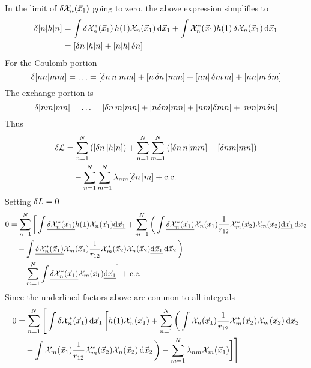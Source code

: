 \documentclass[12pt,a4paper,titlepage]{article}
\newcommand{\Chi}{\mathcal{X}} %
\begin{document}
In the limit of $\var{\Chi_{n}(\vec{x}_{1})}$ going to zero, the above expression simplifies to
\begin{equation}
\begin{aligned}
\var{[n|h|n]}&=\int\var{\Chi_{n}^{*}(\vec{x}_{1})}h(1)\Chi_{n}(\vec{x}_{1})\dd{\vec{x}_{1}}+\int\Chi_{n}^{*}(\vec{x}_{1})h(1)\var{\Chi_{n}(\vec{x}_{1})}\dd{\vec{x}_{1}}\\
&=[\var{n}|h|n]+[n|h|\var{n}]
\end{aligned}
\end{equation}
For the Coulomb portion
\begin{equation}
\var{[nn|mm]}=\ldots=[\var{n}n|mm]+[n\var{n}|mm]+[nn|\var{m}m]+[nn|m\var{m}]
\end{equation}
The exchange portion is
\begin{equation}
\var{[nm|mn]}=\ldots=[\var{n}m|mn]+[n\delta{m}|mn]+[nm|\delta{m}n]+[nm|m\delta{n}]
\end{equation}
Thus
\begin{equation}
\begin{aligned}
\var{\mathcal{L}}&=\sum_{n=1}^{N}\qty([\var{n}|h|n])+\sum_{n=1}^{N}\sum_{m=1}^{N}\qty([\var{n}n|mm]-[\delta{n}m|mn])\\
&\quad-\sum_{n=1}^{N}\sum_{m=1}^{N}\lambda_{nm}[\var{n}|m]+\qcc*
\end{aligned}
\end{equation}
Setting $\var{L}=0$
\begin{equation}
\begin{aligned}
0&=\sum_{n=1}^{N}\bigg[\int\underline{\var{\Chi_{n}^{*}(\vec{x}_{1})}}h(1)\Chi_{n}(\vec{x}_{1})\underline{\dd{\vec{x}_{1}}}+\sum_{m=1}^{N}\bigg(\int\underline{\var{\Chi_{n}^{*}(\vec{x}_{1})}}\Chi_{n}(\vec{x}_{1})\frac{1}{r_{12}}\Chi_{m}^{*}(\vec{x}_{2})\Chi_{m}(\vec{x}_{2})\underline{\dd{\vec{x}_{1}}}\dd{\vec{x}_{2}}\\
&\quad-\int\underline{\var{\Chi_{n}^{*}(\vec{x}_{1})}}\Chi_{m}(\vec{x}_{1})\frac{1}{r_{12}}\Chi_{m}^{*}(\vec{x}_{2})\Chi_{n}(\vec{x}_{2})\underline{\dd{\vec{x}_{1}}}\dd{\vec{x}_{2}}\bigg)\\
&\quad-\sum_{m=1}^{N}\int\underline{\var{\Chi_{n}^{*}(\vec{x}_{1})}}\Chi_{m}(\vec{x}_{1})\underline{\dd{\vec{x}_{1}}}\bigg]+\qcc*
\end{aligned}
\end{equation}
Since the underlined factors above are common to all integrals
\begin{equation}
\begin{aligned}
0&=\sum_{n=1}^{N}\Bigg[\int\var{\Chi_{n}^{*}(\vec{x}_{1})}\dd{\vec{x}_{1}}\bigg[h(1)\Chi_{n}(\vec{x}_{1})+\sum_{n=1}^{N}\bigg(\int\Chi_{n}(\vec{x}_{1})\frac{1}{r_{12}}\Chi_{m}^{*}(\vec{x}_{2})\Chi_{m}(\vec{x}_{2})\dd{\vec{x}_{2}}\\
&\quad-\int\Chi_{m}(\vec{x}_{1})\frac{1}{r_{12}}\Chi_{m}^{*}(\vec{x}_{2})\Chi_{n}(\vec{x}_{2})\dd{\vec{x}_{2}}\bigg)-\sum_{m=1}^{N}\lambda_{nm}\Chi_{m}(\vec{x}_{1})\bigg]\Bigg]
\end{aligned}
\end{equation}
\end{document}
